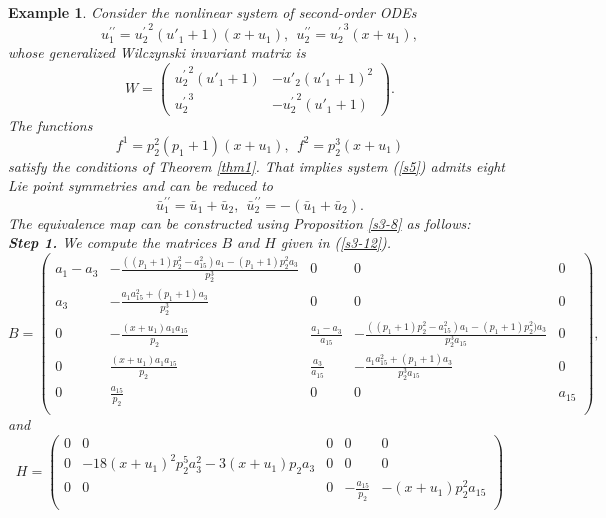 \documentclass[12pt]{article}
\newtheorem{example}[theorem]{Example}
\begin{document}
\begin{example}
 Consider the nonlinear system of second-order ODEs
\begin{equation}\label{s5}
u_1^{\prime\prime}={u^{'}_2}^{2}(u'_1+1)(x+u_1),~~u_2^{\prime\prime}={u^{'}_2}^3(x+u_1),
 \end{equation}
whose generalized Wilczynski invariant matrix is
\begin{equation}
W=\begin{pmatrix}
{u^{'}_2}^{2}(u'_1+1)&-u'_2(u'_1+1)^2\\
{u^{'}_2}^{3}&-{u^{'}_2}^{2}(u'_1+1)
\end{pmatrix}.
\end{equation}
The functions
\begin{equation}\label{s8}
 f^1=p^{2}_2(p_1+1)(x+u_1),~~f^2=p^{3}_2(x+u_1)
\end{equation}
 satisfy the conditions of Theorem \ref{thm1}. That implies system (\ref{s5}) admits eight Lie point symmetries and can be reduced to
\begin{equation}
\bar{u}_1^{\prime\prime}=\bar{u}_1+\bar{u}_2,~~\bar{u}_2^{\prime\prime}=-(\bar{u}_1+\bar{u}_2).
\end{equation}
The equivalence map can be constructed using Proposition \ref{s3-8} as follows:\\
 \textbf{Step 1.} We compute the matrices $B$ and $H$ given in (\ref{s3-12}). \\
\begin{equation}\label{E10}
B=\begin{pmatrix}
a_1-a_3&-\frac{((p_1+1)p_2^2-a_{15}^2)a_1-(p_1+1)p_2^2a_3}{p_2^3}&0&0&0\\
a_3&-\frac{a_1a_{15}^2+(p_1+1)a_3}{p_2^3}&0&0&0\\
0&-\frac{(x+u_1)a_1a_{15}}{p_2}&\frac{a_1-a_3}{a_{15}}&-\frac{((p_1+1)p_2^2-a_{15}^2)a_1-(p_1+1)p_2^2)a_3}{p_2^3a_{15}}&0\\
0&\frac{(x+u_1)a_1a_{15}}{p_2}&\frac{a_3}{a_{15}}&-\frac{a_1a_{15}^2+(p_1+1)a_3}{p_2^3a_{15}}&0\\
0&\frac{a_{15}}{p_2}&0&0&a_{15}\\
\end{pmatrix},
\end{equation}
and\begin{equation}\label{s3-13}
H=\begin{pmatrix}
0&0&0&0&0\\
0&-18(x+u_1)^2p_2^5a_3^2-3(x+u_1)p_2a_3&0&0&0\\
0&0&0&-\frac{a_{15}}{p_2}&-(x+u_1)p_2^2a_{15}\\

\end{pmatrix}
\end{equation}
\end{example}
\end{document}
